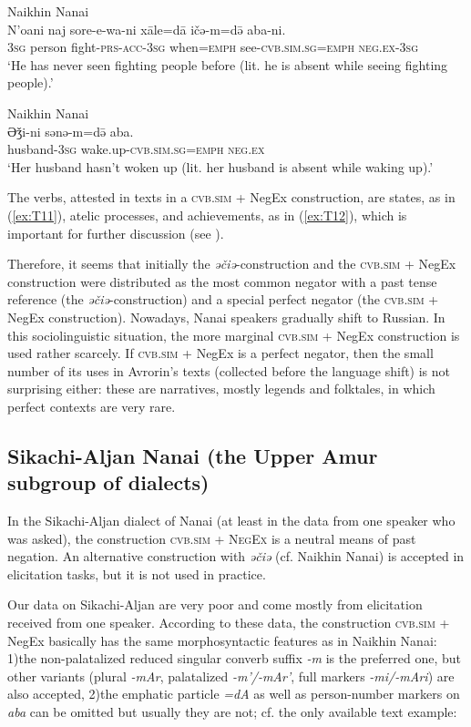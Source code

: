 \documentclass[output=paper,colorlinks,citecolor=brown]{langscibook}
\begin{document}
\ea Naikhin Nanai \label{ex:T11}\\
	\gll N’oani	naj	sore-e-wa-ni	xāle=dā	ičə-m=də̄	aba-ni.\\
	\textsc{3sg}	person	fight-\textsc{prs-acc-3sg}	when=\textsc{emph}	see-\textsc{cvb.sim.sg=emph}	\textsc{neg.ex-3sg}\\
	\glt `He has never seen fighting people before (lit. he is absent while seeing fighting people).' \citep[154, text]{avrorin1986a}
\z

\ea Naikhin Nanai \label{ex:T12}\\
	\gll Əǯi-ni	sənə-m=də̄	aba.\\
	husband-\textsc{3sg}	wake.up-\textsc{cvb.sim.sg=emph}	\textsc{neg.ex}\\
	\glt `Her husband hasn’t woken up (lit. her husband is absent while waking up).' \citep[209, text]{avrorin1986a}
\z

The verbs, attested in texts in a \textsc{cvb.sim} + NegEx construction, are states, as in (\ref{ex:T11}), atelic processes, and achievements, as in (\ref{ex:T12}), which is important for further discussion (see ).

Therefore, it seems that initially the \textit{əčiə}-construction and the \textsc{cvb.sim} + NegEx construction were distributed as the most common negator with a past tense reference (the \textit{əčiə}-construction) and a special perfect negator (the \textsc{cvb.sim} + NegEx construction). Nowadays, Nanai speakers gradually shift to Russian. In this sociolinguistic situation, the more marginal \textsc{cvb.sim} + NegEx construction is used rather scarcely. If \textsc{cvb.sim} + NegEx is a perfect negator, then the small number of its uses in Avrorin’s texts (collected before the language shift) is not surprising either: these are narratives, mostly legends and folktales, in which perfect contexts are very rare.

\subsection{Sikachi-Aljan Nanai (the Upper Amur subgroup of dialects)}\label{sec:T5.2}

In the Sikachi-Aljan dialect of Nanai (at least in the data from one speaker who was asked), the construction \textsc{cvb.sim + NegEx} is a neutral means of past negation. An alternative construction with \textit{əčiə} (cf. Naikhin Nanai) is accepted in elicitation tasks, but it is not used in practice.

Our data on Sikachi-Aljan are very poor and come mostly from elicitation received from one speaker. According to these data, the construction \textsc{cvb.sim} + NegEx basically has the same morphosyntactic features as in Naikhin Nanai: 1)\enspace the non-palatalized reduced singular converb suffix \textit{-m} is the preferred one, but other variants (plural \textit{-mAr}, palatalized ­\textit{-m’/-mAr’}, full markers \textit{-mi/-mAri}) are also accepted, 2)\enspace the emphatic particle \textit{=dA} as well as person-number markers on \textit{aba} can be omitted but usually they are not; cf. the only available text example:
\end{document}
